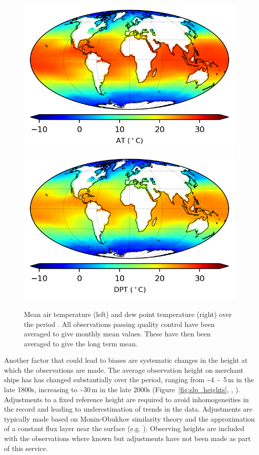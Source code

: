 \begin{figure}[h]
    \centering
    \includegraphics{resources/observations-at-mean-map-optimal.png}
    \includegraphics{resources/observations-dpt-mean-map-optimal.png}
    \caption{Mean air temperature (left) and dew point temperature (right) over the period \datatimerange{}. All observations passing quality control have been averaged to give monthly mean values. These have then been averaged to give the long term mean.\\}
    \label{fig:at-map}
\end{figure}
\FloatBarrier
Another factor that could lead to biases are systematic changes in the height at which the observations are made. The average observation height on merchant ships has has changed substantially over the period, ranging from \sim 4~-~5\,m in the late 1800s, increasing to \sim 30\,m in the late 2000s (Figure~\ref{fig:slp_heights}, \cite{Kent2007}, \cite{ Kent2013NMAT}). 
Adjustments to a fixed reference height are required to avoid inhomogeneities in the record and leading to underestimation of trends in the data. 
Adjustments are typically made based on Monin-Obukhov similarity theory and the approximation of a constant flux layer near the surface (e.g. \cite{Businger1971}). 
Observing heights are included with the observations where known but adjustments have not been made as part of this service.

